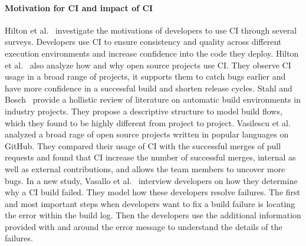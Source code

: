 \documentclass[\myrootdir/main.tex]{subfiles}
\begin{document}
\paragraph{Motivation for CI and impact of CI}
Hilton et al.~\cite{hilton2017trade-offs} investigate the motivations of developers to use CI through several surveys.
Developers use CI to ensure consistency and quality across different execution environments and increase confidence into the code they deploy.
Hilton et al.~\cite{hilton2016usage} also analyze how and why open source projects use CI.
They observe CI usage in a broad range of projects, it supports them to catch bugs earlier and have more confidence in a successful build and shorten release cycles.
Stahl and Bosch~\cite{staahl2014modeling} provide a hollistic review of literature on automatic build environments in industry projects.
They propose a descriptive structure to model build flows, which they found to be highly different from project to project.
Vasilescu et al.~\cite{vasilescu2015quality} analyzed a broad rage of open source projects written in popular languages on GitHub.
They compared their usage of CI with the successful merges of pull requests and found that CI increase the number of successful merges, internal as well as external contributions, and allows the team members to uncover more bugs.
In a new study, Vasallo et al.~\cite{vassallo2019every} interview developers on how they determine why a CI build failed.
They model how these developers resolve failures.
The first and most important steps when developers want to fix a build failure is locating the error within the build log.
Then the developers use the additional information provided with and around the error message to understand the details of the failures.
\end{document}

